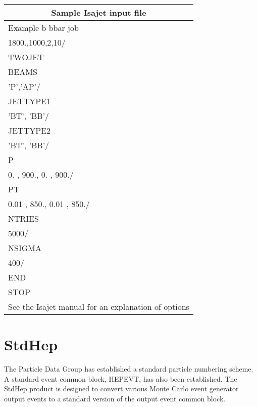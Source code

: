 \begin{tabular}{|l|} \hline
\multicolumn{1}{|c|}{Sample Isajet input file} \\  \hline
Example b bbar job \\
1800.,1000,2,10/ \\
TWOJET \\
BEAMS \\
'P','AP'/ \\
JETTYPE1 \\
'BT', 'BB'/ \\
JETTYPE2 \\
'BT', 'BB'/ \\
P \\
0. , 900., 0. , 900./ \\
PT \\
0.01 , 850., 0.01 , 850./ \\
NTRIES \\
5000/ \\
NSIGMA \\
400/ \\
END \\
STOP \\ \hline
See the Isajet manual for an explanation of options \\ \hline
\end{tabular}

\section{StdHep}

The Particle Data Group has established a standard particle numbering scheme.
A standard event common block, HEPEVT, has also been established.
The StdHep product is designed to convert various Monte Carlo event
generator output events to a standard version of the output event 
common block. 

